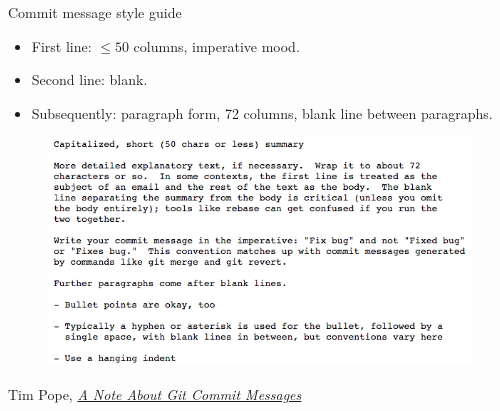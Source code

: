 \begin{frame}{Commit message style guide}
  \begin{itemize}
    \item First line: $ \le 50 $ columns, imperative mood.
    \item Second line: blank.
    \item Subsequently: paragraph form, 72 columns, blank line between
          paragraphs.
  \end{itemize}

  \begin{figure}
    \includegraphics[scale=0.35]{pope_commit_message.png}
  \end{figure}
  \footnotesize{Tim Pope,
    \href{http://tbaggery.com/2008/04/19/a-note-about-git-commit-messages.html}
         {\emph{A Note About Git Commit Messages}}}
\end{frame}


